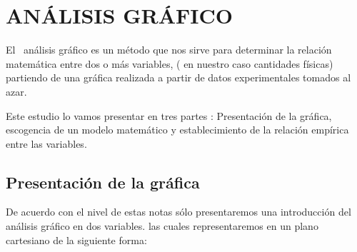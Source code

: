 \documentclass[12pt]{article}
\begin{document}
\section{AN\'{A}LISIS GR\'{A}FICO}

El \ an\'{a}lisis gr\'{a}fico es un m\'{e}todo que nos sirve para determinar
la relaci\'{o}n matem\'{a}tica entre dos o m\'{a}s variables, ( en nuestro
caso cantidades f\'{i}sicas) partiendo de una gr\'{a}fica realizada a partir
de datos experimentales tomados al azar.

Este estudio lo vamos presentar en tres partes :\newline
Presentaci\'{o}n de la gr\'{a}fica, escogencia de un modelo matem\'{a}tico y
establecimiento de la relaci\'{o}n emp\'{i}rica entre las variables.

\subsection{Presentaci\'{o}n de la gr\'{a}fica}

De acuerdo con el nivel de estas notas s\'{o}lo presentaremos una
introducci\'{o}n del an\'{a}lisis gr\'{a}fico en dos variables. las cuales
representaremos en un plano cartesiano de la siguiente forma:
\end{document}
